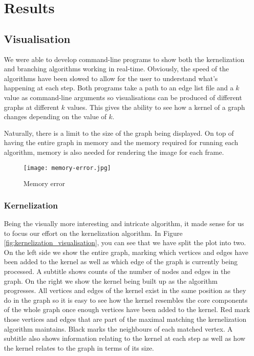 \section{Results}

\subsection{Visualisation}

We were able to develop command-line programs to show both the
kernelization and branching algorithms working in real-time. Obviously,
the speed of the algorithms have been slowed to allow for the user to
understand what's happening at each step. Both programs take a path to
an edge list file and a \(k\) value as command-line arguments so
visualisations can be produced of different graphs at different \(k\)
values. This gives the ability to see how a kernel of a graph changes
depending on the value of \(k\).

Naturally, there is a limit to the size of the graph being displayed. On
top of having the entire graph in memory and the memory required for
running each algorithm, memory is also needed for rendering the image
for each frame.

\begin{figure}[htb]
    \centering
    \texttt{[image: memory-error.jpg]}
    \caption{Memory error}
\end{figure}

\subsubsection{Kernelization}

Being the visually more interesting and intricate algorithm, it made
sense for us to focus our effort on the kernelization algorithm. In
Figure \ref{fig:kernelization_visualisation}, you can see that we have split the plot into two. On the
left side we show the entire graph, marking which vertices and edges
have been added to the kernel as well as which edge of the graph is
currently being processed. A subtitle shows counts of the number of
nodes and edges in the graph. On the right we show the kernel being
built up as the algorithm progresses. All vertices and edges of the
kernel exist in the same position as they do in the graph so it is easy
to see how the kernel resembles the core components of the whole graph
once enough vertices have been added to the kernel. Red mark those
vertices and edges that are part of the maximal matching the
kernelization algorithm maintains. Black marks the neighbours of each
matched vertex. A subtitle also shows information relating to the kernel
at each step as well as how the kernel relates to the graph in terms of
its size.


